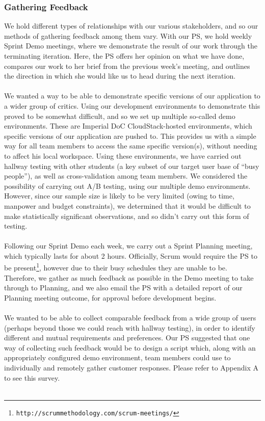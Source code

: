 \documentclass[a4paper, 10pt]{article}
\begin{document}
\subsubsection{Gathering Feedback}
We hold different types of relationships with our various stakeholders, and so our methods of gathering feedback among them vary. With our PS, we hold weekly Sprint Demo meetings, where we demonstrate the result of our work through the terminating iteration. Here, the PS offers her opinion on what we have done, compares our work to her brief from the previous week's meeting, and outlines the direction in which she would like us to head during the next iteration. \\\\
We wanted a way to be able to demonstrate specific versions of our application to a wider group of critics. Using our development environments to demonstrate this proved to be somewhat difficult, and so we set up multiple so-called demo environments. These are Imperial DoC CloudStack-hosted environments, which specific versions of our application are pushed to. This provides us with a simple way for all team members to access the same specific version(s), without needing to affect his local workspace. Using these environments, we have carried out hallway testing with other students (a key subset of our target user base of “busy people”), as well as cross-validation among team members. We considered the possibility of carrying out A/B testing, using our multiple demo environments. However, since our sample size is likely to be very limited (owing to time, manpower and budget constraints), we determined that it would be difficult to make statistically significant observations, and so didn't carry out this form of testing. \\\\
Following our Sprint Demo each week, we carry out a Sprint Planning meeting, which typically lasts for about 2 hours. Officially, Scrum would require the PS to be present\footnote{\texttt{http://scrummethodology.com/scrum-meetings/}}, however due to their busy schedules they are unable to be. Therefore, we gather as much feedback as possible in the Demo meeting to take through to Planning, and we also email the PS with a detailed report of our Planning meeting outcome, for approval before development begins.\\\\
We wanted to be able to collect comparable feedback from a wide group of users (perhaps beyond those we could reach with hallway testing), in order to identify different and mutual requirements and preferences. Our PS suggested that one way of collecting such feedback would be to design a script which, along with an appropriately configured demo environment, team members could use to individually and remotely gather customer responses. Please refer to Appendix A to see this survey.\\\\
\end{document}
